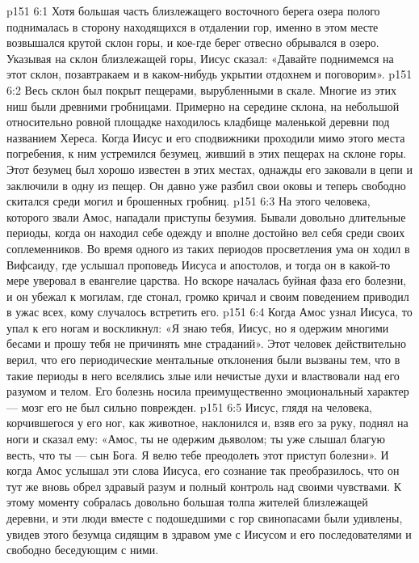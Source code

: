 \vs p151 6:1 Хотя большая часть близлежащего восточного берега озера полого поднималась в сторону находящихся в отдалении гор, именно в этом месте возвышался крутой склон горы, и кое\hyp{}где берег отвесно обрывался в озеро. Указывая на склон близлежащей горы, Иисус сказал: «Давайте поднимемся на этот склон, позавтракаем и в каком\hyp{}нибудь укрытии отдохнем и поговорим».
\vs p151 6:2 Весь склон был покрыт пещерами, вырубленными в скале. Многие из этих ниш были древними гробницами. Примерно на середине склона, на небольшой относительно ровной площадке находилось кладбище маленькой деревни под названием Хереса. Когда Иисус и его сподвижники проходили мимо этого места погребения, к ним устремился безумец, живший в этих пещерах на склоне горы. Этот безумец был хорошо известен в этих местах, однажды его заковали в цепи и заключили в одну из пещер. Он давно уже разбил свои оковы и теперь свободно скитался среди могил и брошенных гробниц.
\vs p151 6:3 На этого человека, которого звали Амос, нападали приступы безумия. Бывали довольно длительные периоды, когда он находил себе одежду и вполне достойно вел себя среди своих соплеменников. Во время одного из таких периодов просветления ума он ходил в Вифсаиду, где услышал проповедь Иисуса и апостолов, и тогда он в какой\hyp{}то мере уверовал в евангелие царства. Но вскоре началась буйная фаза его болезни, и он убежал к могилам, где стонал, громко кричал и своим поведением приводил в ужас всех, кому случалось встретить его.
\vs p151 6:4 Когда Амос узнал Иисуса, то упал к его ногам и воскликнул: «Я знаю тебя, Иисус, но я одержим многими бесами и прошу тебя не причинять мне страданий». Этот человек действительно верил, что его периодические ментальные отклонения были вызваны тем, что в такие периоды в него вселялись злые или нечистые духи и властвовали над его разумом и телом. Его болезнь носила преимущественно эмоциональный характер --- мозг его не был сильно поврежден.
\vs p151 6:5 Иисус, глядя на человека, корчившегося у его ног, как животное, наклонился и, взяв его за руку, поднял на ноги и сказал ему: «Амос, ты не одержим дьяволом; ты уже слышал благую весть, что ты --- сын Бога. Я велю тебе преодолеть этот приступ болезни». И когда Амос услышал эти слова Иисуса, его сознание так преобразилось, что он тут же вновь обрел здравый разум и полный контроль над своими чувствами. К этому моменту собралась довольно большая толпа жителей близлежащей деревни, и эти люди вместе с подошедшими с гор свинопасами были удивлены, увидев этого безумца сидящим в здравом уме с Иисусом и его последователями и свободно беседующим с ними.
